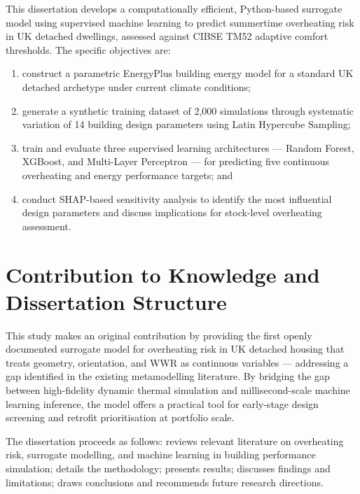\documentclass[12pt,a4paper]{report}
\begin{document}
This dissertation develops a computationally efficient, Python-based surrogate model using supervised machine learning to predict summertime overheating risk in UK detached dwellings, assessed against CIBSE TM52 adaptive comfort thresholds. The specific objectives are:

\begin{enumerate}[label=(\roman*)]
    \item construct a parametric EnergyPlus building energy model for a standard UK detached archetype under current climate conditions;
    \item generate a synthetic training dataset of 2{,}000 simulations through systematic variation of 14 building design parameters using Latin Hypercube Sampling;
    \item train and evaluate three supervised learning architectures --- Random Forest, XGBoost, and Multi-Layer Perceptron --- for predicting five continuous overheating and energy performance targets; and
    \item conduct SHAP-based sensitivity analysis to identify the most influential design parameters and discuss implications for stock-level overheating assessment.
\end{enumerate}


\section{Contribution to Knowledge and Dissertation Structure}
\label{sec:contribution}

This study makes an original contribution by providing the first openly documented surrogate model for overheating risk in UK detached housing that treats geometry, orientation, and WWR as continuous variables --- addressing a gap identified in the existing metamodelling literature. By bridging the gap between high-fidelity dynamic thermal simulation and millisecond-scale machine learning inference, the model offers a practical tool for early-stage design screening and retrofit prioritisation at portfolio scale.

The dissertation proceeds as follows:  reviews relevant literature on overheating risk, surrogate modelling, and machine learning in building performance simulation;  details the methodology;  presents results;  discusses findings and limitations;  draws conclusions and recommends future research directions.
\end{document}
